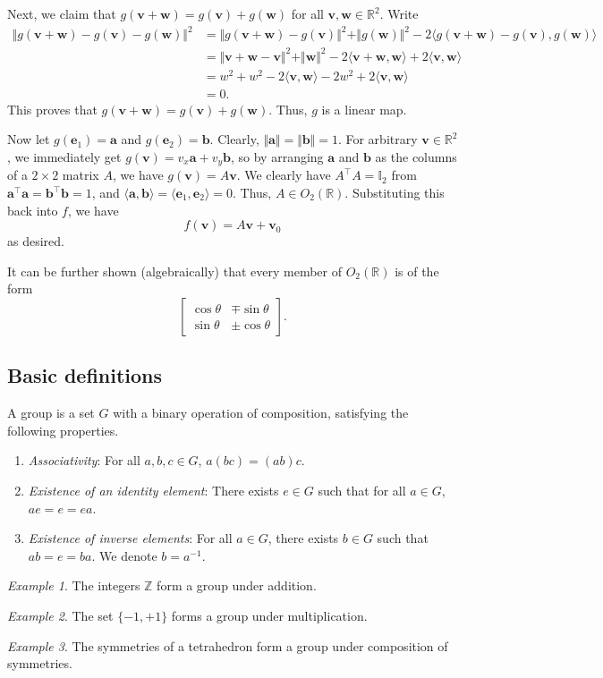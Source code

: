 \documentclass[11pt]{article}
\newcommand{\R}{\mathbb{R}}
\newcommand{\Z}{\mathbb{Z}}
\renewcommand{\vec}[1]{\boldsymbol{#1}}
\newcommand{\vv}{\vec{v}}
\newcommand{\vw}{\vec{w}}
\newcommand{\ve}{\vec{e}}
\newcommand{\va}{\vec{a}}
\newcommand{\vb}{\vec{b}}
\newcommand{\norm}[1]{\Vert #1 \Vert}
\newcommand{\ip}[2]{\langle #1, #2 \rangle}
\theoremstyle{definition}
\theoremstyle{remark}
\newtheorem*{example}{Example}
\numberwithin{equation}{section}
\begin{document}
    Next, we claim that $g(\vv + \vw) = g(\vv) + g(\vw)$ for all $\vv, \vw \in
    \R^2$. Write
    \begin{align*}
        \norm{g(\vv + \vw) - g(\vv) - g(\vw)}^2 &= \norm{g(\vv + \vw) - g(\vv)}^2 +
        \norm{g(\vw)}^2 - 2\ip{g(\vv + \vw) - g(\vv)}{g(\vw)} \\
        &= \norm{\vv + \vw - \vv}^2 + \norm{\vw}^2 - 2\ip{\vv + \vw}{\vw} +
        2\ip{\vv}{\vw} \\
        &= w^2 + w^2 - 2\ip{\vv}{\vw} - 2w^2 + 2\ip{\vv}{\vw} \\
        &= 0.
    \end{align*}
    This proves that $g(\vv + \vw) = g(\vv) + g(\vw)$. Thus, $g$ is a linear map.

    Now let $g(\ve_1) = \va$ and $g(\ve_2) = \vb$. Clearly, $\norm{\va} = \norm{\vb}
    = 1$. For arbitrary $\vv\in \R^2$, we immediately get $g(\vv) = v_x\va + v_y\vb$,
    so by arranging $\va$ and $\vb$ as the columns of a $2\times 2$ matrix $A$, we
    have $g(\vv) = A\vv$. We clearly have $A^\top A = \mathbb{I}_2$ from $\va^\top\va
    = \vb^\top\vb = 1$, and $\ip{\va}{\vb} = \ip{\ve_1}{\ve_2} = 0$. Thus, $A \in
    O_2(\R)$. Substituting this back into $f$, we have \[
        f(\vv) = A\vv + \vv_0
    \] as desired.

    It can be further shown (algebraically) that every member of $O_2(\R)$ is of the
    form \[
        \begin{bmatrix}
            \cos\theta & \mp\sin\theta \\ \sin\theta & \pm \cos\theta
        \end{bmatrix}.
    \] 

    \subsection{Basic definitions}
    \begin{definition}
        A group is a set $G$ with a binary operation of composition, satisfying the
        following properties.
        \begin{enumerate}
        \itemsep0em
            \item \emph{Associativity}: For all $a, b, c \in G$, $a(bc) = (ab)c$.
            \item \emph{Existence of an identity element}: There exists $e \in G$
            such that for all $a \in G$, $ae = e = ea$.
            \item \emph{Existence of inverse elements}: For all $a \in G$, there
            exists $b \in G$ such that $ab = e = ba$. We denote $b = a^{-1}$.
        \end{enumerate}
    \end{definition}
    \begin{example}
        The integers $\Z$ form a group under addition.
    \end{example}
    \begin{example}
        The set $\{-1, +1\}$ forms a group under multiplication.
    \end{example}
    \begin{example}
        The symmetries of a tetrahedron form a group under composition of symmetries.
    \end{example}
    
\end{document}
